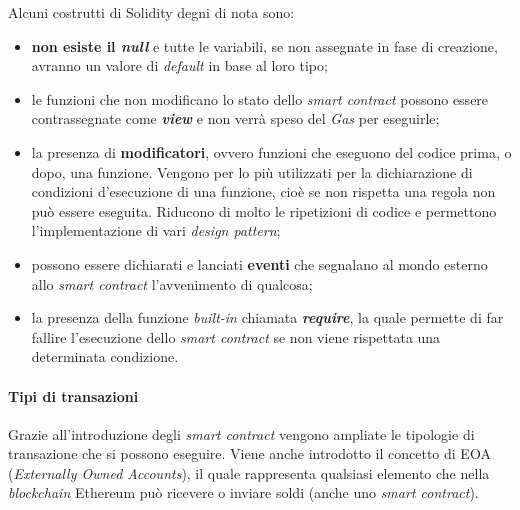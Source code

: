 \noindent Alcuni costrutti di Solidity degni di nota sono:
\begin{itemize}
  \item \textbf{non esiste il \textit{null}} e tutte le variabili, se non assegnate in fase di creazione, avranno un valore di \textit{default} in base al loro tipo;
  \item le funzioni che non modificano lo stato dello \textit{smart contract} possono essere contrassegnate come \textbf{\textit{view}} e non verrà speso del \textit{Gas} per eseguirle;
  \item la presenza di \textbf{modificatori}, ovvero funzioni che eseguono del codice prima, o dopo, una funzione. Vengono per lo più utilizzati per la dichiarazione di condizioni d'esecuzione di una funzione, cioè se non rispetta una regola non può essere eseguita. Riducono di molto le ripetizioni di codice e permettono l'implementazione di vari \textit{design pattern}; 
  \item possono essere dichiarati e lanciati \textbf{eventi} che segnalano al mondo esterno allo \textit{smart contract} l'avvenimento di qualcosa;
  \item la presenza della funzione \textit{built-in} chiamata \textbf{\textit{require}}, la quale permette di far fallire l'esecuzione dello \textit{smart contract} se non viene rispettata una determinata condizione.
\end{itemize}

\paragraph{Tipi di transazioni}
Grazie all'introduzione degli \textit{smart contract} vengono ampliate le tipologie di transazione che si possono eseguire. Viene anche introdotto il concetto di EOA (\textit{Externally Owned Accounts}), il quale rappresenta qualsiasi elemento che nella \textit{blockchain} Ethereum può ricevere o inviare soldi (anche uno \textit{smart contract}). \\

